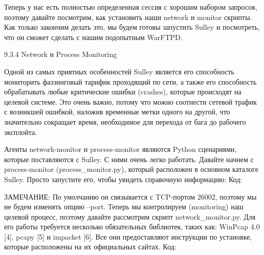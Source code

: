 \documentclass[12pt, a4paper, oneside]{book}
\begin{document}
Теперь у нас есть полностью определенная сессия с хорошим набором запросов, поэтому давайте посмотрим, как установить наши network и monitor скрипты. Как только закончим делать это, мы будем готовы запустить Sulley и посмотреть, что он сможет сделать с нашим подопытным WarFTPD.

9.3.4 Network и Process Monitoring

Одной из самых приятных особенностей Sulley является его способность мониторить фаззинговый тарифик проходящий по сети, а также его способность обрабатывать любые критические ошибки (crashes), которые происходят на целевой системе. Это очень важно, потому что можно соотнести сетевой трафик с возникшей ошибкой, наложив временные метки одного на другой, что значительно сокращает время, необходимое для перехода от бага до рабочего эксплойта.

Агенты network-monitor и process-monitor являются Python сценариями, которые поставляются с Sulley. С ними очень легко работать. Давайте начнем с process-monitor (process\_monitor.py), который расположен в основном каталоге Sulley. Просто запустите его, чтобы увидеть справочную информацию:
Код:


ЗАМЕЧАНИЕ: По умолчанию он связывается с TCP-портом 26002, поэтому мы не будем изменять опцию --port.
Теперь мы контролируем (monitoring) наш целевой процесс, поэтому давайте рассмотрим скрипт network\_monitor.py. Для его работы требуется несколько обязательных библиотек, таких как: WinPcap 4.0 [4], pcapy [5] и impacket [6]. Все они предоставляют инструкции по установке, которые расположены на их официальных сайтах. 
Код:


\end{document}
